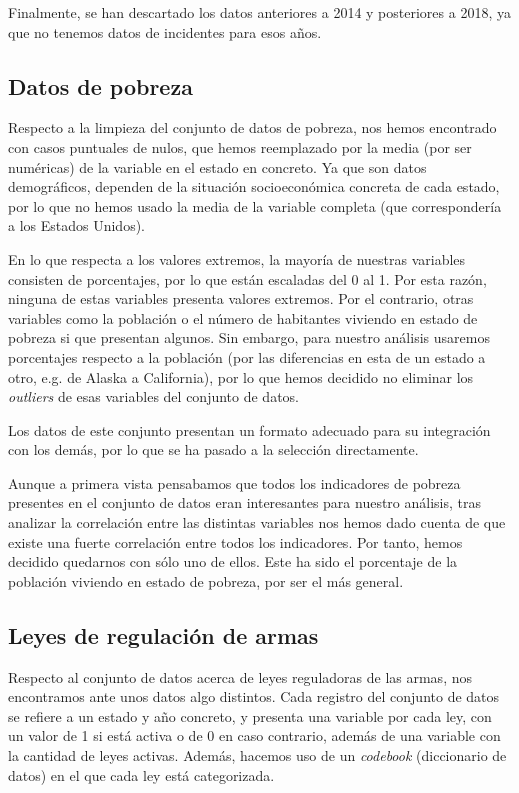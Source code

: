 \documentclass[11pt,a4paper]{article}
\begin{document}
Finalmente, se han descartado los datos anteriores a 2014 y posteriores a 2018, ya que no tenemos datos de incidentes para esos años.

\subsection{Datos de pobreza}

Respecto a la limpieza del conjunto de datos de pobreza, nos hemos encontrado con casos puntuales de nulos, que hemos reemplazado por la media (por ser numéricas) de la variable en el estado en concreto. Ya que son datos demográficos, dependen de la situación socioeconómica concreta de cada estado, por lo que no hemos usado la media de la variable completa (que correspondería a los Estados Unidos).

En lo que respecta a los valores extremos, la mayoría de nuestras variables consisten de porcentajes, por lo que están escaladas del 0 al 1. Por esta razón, ninguna de estas variables presenta valores extremos. Por el contrario, otras variables como la población o el número de habitantes viviendo en estado de pobreza si que presentan algunos. Sin embargo, para nuestro análisis usaremos porcentajes respecto a la población (por las diferencias en esta de un estado a otro, e.g. de Alaska a California), por lo que hemos decidido no eliminar los \textit{outliers} de esas variables del conjunto de datos.

Los datos de este conjunto presentan un formato adecuado para su integración con los demás, por lo que se ha pasado a la selección directamente.

Aunque a primera vista pensabamos que todos los indicadores de pobreza presentes en el conjunto de datos eran interesantes para nuestro análisis, tras analizar la correlación entre las distintas variables nos hemos dado cuenta de que existe una fuerte correlación entre todos los indicadores. Por tanto, hemos decidido quedarnos con sólo uno de ellos. Este ha sido el porcentaje de la población viviendo en estado de pobreza, por ser el más general.

\subsection{Leyes de regulación de armas}

Respecto al conjunto de datos acerca de leyes reguladoras de las armas, nos encontramos ante unos datos algo distintos. Cada registro del conjunto de datos se refiere a un estado y año concreto, y presenta una variable por cada ley, con un valor de 1 si está activa o de 0 en caso contrario, además de una variable con la cantidad de leyes activas. Además, hacemos uso de un \textit{codebook} (diccionario de datos) en el que cada ley está categorizada.
\end{document}
